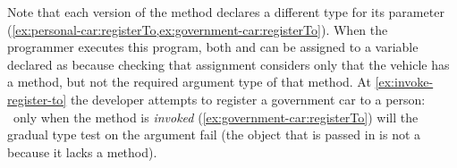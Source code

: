 Note that each version of the  method
declares a different type for its parameter
(\cref{ex:personal-car:registerTo,ex:government-car:registerTo}).
%
When the programmer executes this program,
both  and  can be assigned to
a variable declared as  because checking that assignment considers only that the vehicle has
a  method, but not the required argument type of that
method.
%
At \cref{ex:invoke-register-to} the developer
attempts to register a government car to a person:%
~only when the method is \textit{invoked} (\cref{ex:government-car:registerTo})
will the gradual type test on the argument fail
(the object that is passed in is not a  because it lacks a
 method).

